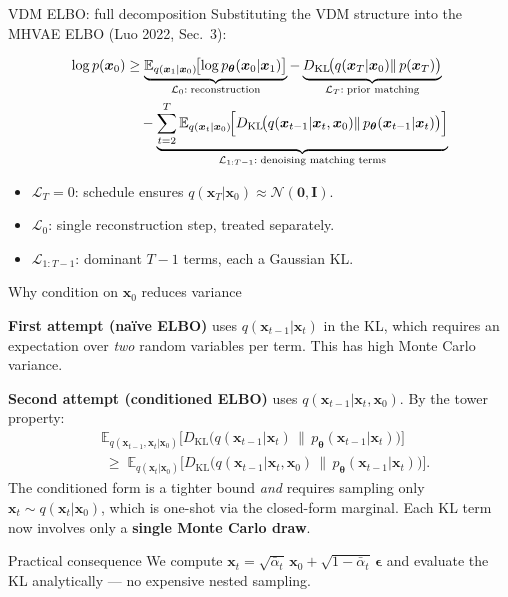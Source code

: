 \documentclass[aspectratio=169,11pt]{beamer}
\newcommand{\E}{\mathbb{E}}
\newcommand{\DKL}{D_{\mathrm{KL}}}
\newcommand{\Norm}{\mathcal{N}}
\newcommand{\bx}{\bm{x}}
\newcommand{\beps}{\bm{\epsilon}}
\newcommand{\btheta}{\bm{\theta}}
\begin{document}
\begin{frame}{VDM ELBO: full decomposition}
\small
Substituting the VDM structure into the MHVAE ELBO (Luo 2022, Sec.\ 3):

\vspace{-2pt}
\begin{align*}
\log p(\bx_0)
&\geq
\underbrace{\E_{q(\bx_1|\bx_0)}\!
  \bigl[\log p_{\btheta}(\bx_0|\bx_1)\bigr]}_{\mathcal{L}_0:\;\text{reconstruction}}
-\underbrace{\DKL\!\bigl(q(\bx_T|\bx_0)\|\,p(\bx_T)\bigr)}_{\mathcal{L}_T:\;\text{prior matching}}\\
&\quad
-\underbrace{\sum_{t=2}^{T}\E_{q(\bx_t|\bx_0)}\!
  \Bigl[\DKL\!\bigl(q(\bx_{t-1}|\bx_t,\bx_0)\|\,
               p_{\btheta}(\bx_{t-1}|\bx_t)\bigr)\Bigr]}_{\mathcal{L}_{1:T-1}:\;\text{denoising matching terms}}
\end{align*}

\vspace{-2pt}
\begin{itemize}
  \setlength\itemsep{2pt}
  \item $\mathcal{L}_T = 0$: schedule ensures $q(\bx_T|\bx_0)\approx\Norm(\bm{0},\mathbf{I})$.
  \item $\mathcal{L}_0$: single reconstruction step, treated separately.
  \item $\mathcal{L}_{1:T-1}$: dominant $T-1$ terms, each a Gaussian KL.
\end{itemize}
\end{frame}

\begin{frame}{Why condition on $\bx_0$ reduces variance}

\textbf{First attempt (naïve ELBO)} uses $q(\bx_{t-1}|\bx_t)$ in the KL,
which requires an expectation over \emph{two} random variables per term.
This has high Monte Carlo variance.

\medskip
\textbf{Second attempt (conditioned ELBO)} uses $q(\bx_{t-1}|\bx_t,\bx_0)$.
By the tower property:
\begin{align*}
  &\E_{q(\bx_{t-1},\bx_t|\bx_0)}\!\bigl[
    \DKL\!\bigl(q(\bx_{t-1}|\bx_t)\,\|\,p_{\btheta}(\bx_{t-1}|\bx_t)\bigr)\bigr]\\
  &\;\geq\;
  \E_{q(\bx_t|\bx_0)}\!\bigl[
    \DKL\!\bigl(q(\bx_{t-1}|\bx_t,\bx_0)\,\|\,p_{\btheta}(\bx_{t-1}|\bx_t)\bigr)\bigr].
\end{align*}
The conditioned form is a tighter bound \emph{and} requires sampling only
$\bx_t\sim q(\bx_t|\bx_0)$, which is one-shot via the closed-form marginal.
Each KL term now involves only a \textbf{single Monte Carlo draw}.

\begin{alertblock}{Practical consequence}
We compute $\bx_t = \sqrt{\bar\alpha_t}\,\bx_0 + \sqrt{1-\bar\alpha_t}\,\beps$
and evaluate the KL analytically — no expensive nested sampling.
\end{alertblock}
\end{frame}
\end{document}
